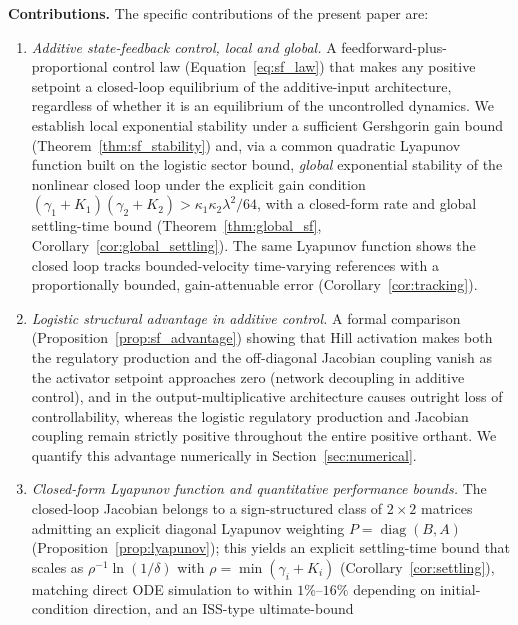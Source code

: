 \documentclass[12pt]{article}
\begin{document}
\medskip
\noindent\textbf{Contributions.} The specific contributions of the
present paper are:
\begin{enumerate}
  \item \emph{Additive state-feedback control, local and global.} A
        feedforward-plus-proportional control law
        (Equation~\eqref{eq:sf_law}) that makes any positive setpoint a
        closed-loop equilibrium of the additive-input architecture,
        regardless of whether it is an equilibrium of the uncontrolled
        dynamics. We establish local exponential stability under a
        sufficient Gershgorin gain bound (Theorem~\ref{thm:sf_stability})
        and, via a common quadratic Lyapunov function built on the
        logistic sector bound, \emph{global} exponential stability of the
        nonlinear closed loop under the explicit gain condition
        $(\gamma_1+K_1)(\gamma_2+K_2)>\kappa_1\kappa_2\lambda^2/64$, with
        a closed-form rate and global settling-time bound
        (Theorem~\ref{thm:global_sf}, Corollary~\ref{cor:global_settling}).
        The same Lyapunov function shows the closed loop tracks
        bounded-velocity time-varying references with a proportionally
        bounded, gain-attenuable error (Corollary~\ref{cor:tracking}).
  \item \emph{Logistic structural advantage in additive control.} A formal
        comparison (Proposition~\ref{prop:sf_advantage}) showing that Hill
        activation makes both the regulatory production and the off-diagonal
        Jacobian coupling vanish as the activator setpoint approaches zero
        (network decoupling in additive control), and in the
        output-multiplicative architecture causes outright loss of
        controllability, whereas the
        logistic regulatory production and Jacobian coupling remain strictly
        positive throughout the entire positive orthant. We quantify this
        advantage numerically in Section~\ref{sec:numerical}.
  \item \emph{Closed-form Lyapunov function and quantitative performance
        bounds.} The closed-loop Jacobian belongs to a sign-structured class
        of $2\times 2$ matrices admitting an explicit diagonal Lyapunov
        weighting $P=\operatorname{diag}(B,A)$
        (Proposition~\ref{prop:lyapunov}); this yields an explicit
        settling-time bound that scales as $\rho^{-1}\ln(1/\delta)$ with
        $\rho=\min(\gamma_i+K_i)$ (Corollary~\ref{cor:settling}), matching
        direct ODE simulation to within $1\%$--$16\%$ depending on
        initial-condition direction, and an ISS-type ultimate-bound

\end{enumerate}
\end{document}

